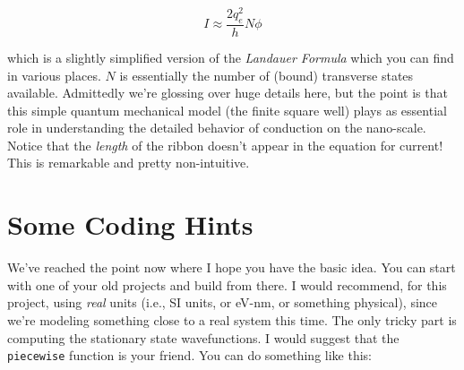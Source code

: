 \documentclass[11pt]{article} %
\begin{document}
\begin{equation}
I \approx \frac{2 q_e^2}{h} N \phi
\label{eq4}
\end{equation}

which is a slightly simplified version of the {\it Landauer Formula} which you can find in various places. $N$ is essentially the number of (bound) transverse states available. Admittedly we're glossing over huge details here, but the point is that this simple quantum mechanical model (the finite square well) plays as essential role in understanding the detailed behavior of conduction on the nano-scale. Notice that the {\it length} of the ribbon doesn't appear in the equation for current! This is remarkable and pretty non-intuitive.

\section*{Some Coding Hints}

We've reached the point now where I hope you have the basic idea. You can start with one of your old projects and build from there. I would recommend, for this project, using {\it real} units (i.e., SI units, or eV-nm, or something physical), since we're modeling something close to a real system this time. The only tricky part is computing the stationary state wavefunctions. I would suggest that the {\tt piecewise} function is your friend. You can do something like this:
\end{document}
